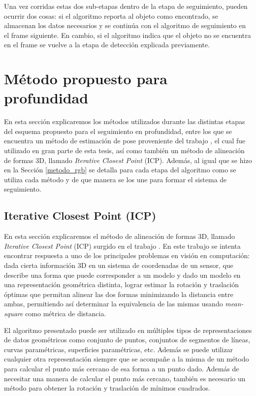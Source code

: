 Una vez corridas estas dos sub-etapas dentro de la etapa de seguimiento, pueden ocurrir dos cosas: si el algoritmo reporta al objeto como encontrado, se almacenan los datos necesarios y se continúa con el algoritmo de seguimiento en el frame siguiente. En cambio, si el algoritmo indica que el objeto no se encuentra en el frame se vuelve a la etapa de detección explicada previamente.






\section{Método propuesto para profundidad}\label{metodo_d}
En esta sección explicaremos los métodos utilizados durante las distintas etapas del esquema propuesto para el seguimiento en profundidad, entre los que se encuentra un método de estimación de pose proveniente del trabajo \cite{6630856}, el cual fue utilizado en gran parte de esta tesis, así como también un método de alineación de formas 3D, llamado \textit{Iterative Closest Point} (ICP). Además, al igual que se hizo en la Sección \ref{metodo_rgb} se detalla para cada etapa del algoritmo como se utiliza cada método y de que manera se los une para formar el sistema de seguimiento.


\subsection{Iterative Closest Point (ICP)}\label{ICP}
En esta sección explicaremos el método de alineación de formas 3D, llamado \textit{Iterative Closest Point} (ICP) surgido en el trabajo \cite{besl1992method}. En este trabajo se intenta encontrar respuesta a uno de los principales problemas en visión en computación: dada cierta información 3D en un sistema de coordenadas de un sensor, que describe una forma que puede corresponder a un modelo y dado un modelo en una representación geométrica distinta, lograr estimar la rotación y traslación óptimas que permitan alinear las dos formas minimizando la distancia entre ambas, permitiendo así determinar la equivalencia de las mismas usando \textit{mean-square} como métrica de distancia.

El algoritmo presentado puede ser utilizado en múltiples tipos de representaciones de datos geométricos como conjunto de puntos, conjuntos de segmentos de líneas, curvas paramétricas, superficies paramétricas, etc. Además se puede utilizar cualquier otra representación siempre que se acompañe a la misma de un método para calcular el punto más cercano de esa forma a un punto dado. Además de necesitar una manera de calcular el punto más cercano, también es necesario un método para obtener la rotación y traslación de mínimos cuadrados.

